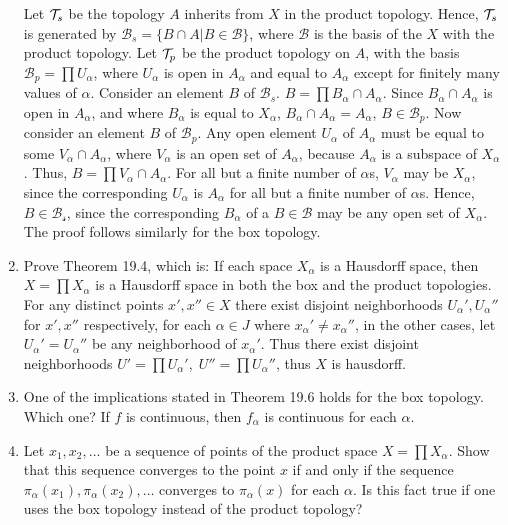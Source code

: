 \documentclass[12pt,letterpaper]{article}
\begin{document}
\begin{enumerate}
  \indent Let $\mathcal{T}_s$ be the topology $A$ inherits from $X$ in the product topology. Hence, $\mathcal{T}_s$ is generated by $\mathcal{B}_s = \{ B \cap A | B\in \mathcal{B} \}$, where $\mathcal{B}$ is the basis of the $X$ with the product topology. Let $\mathcal{T}_p$ be the product topology on $A$, with the basis $\mathcal{B}_p=\prod U_\alpha$, where $U_\alpha$ is open in $A_\alpha$ and equal to $A_\alpha$ except for finitely many values of $\alpha$. \n
  \indent Consider an element $B$ of $\mathcal{B}_s$. $B=\prod B_\alpha \cap A_\alpha$. Since $B_\alpha \cap A_\alpha$ is open in $A_\alpha$, and where $B_\alpha$ is equal to $X_\alpha$, $B_\alpha \cap A_\alpha = A_\alpha$, $B\in \mathcal{B}_p$.\hspace{5in}\n
  \indent Now consider an element $B$ of $\mathcal{B}_p$. Any open element $U_\alpha$ of $A_\alpha$ must be equal to some $V_\alpha \cap A_\alpha$, where $V_\alpha$ is an open set of $A_\alpha$, because $A_\alpha$ is a subspace of $X_\alpha$. Thus, $B=\prod V_\alpha \cap A_\alpha$. For all but a finite number of $\alpha$s, $V_\alpha$ may be $X_\alpha$, since the corresponding $U_\alpha$ is $A_\alpha$ for all but a finite number of $\alpha$s. Hence, $B\in \mathcal{B_s}$, since the corresponding $B_\alpha$ of a $B\in \mathcal{B}$ may be any open set of $X_\alpha$. The proof follows similarly for the box topology.
  \item Prove Theorem 19.4, which is: If each space $X_\alpha$ is a Hausdorff space, then $X=\prod X_\alpha$ is a Hausdorff space in both the box and the product topologies. \hspace{5in} \n
  \indent For any distinct points $x', x'' \in X$ there exist disjoint neighborhoods $U_\alpha', U_\alpha''$ for $x', x''$ respectively, for each $\alpha \in J$ where $x_\alpha' \neq x_\alpha''$, in the other cases, let $U_\alpha'=U_\alpha''$ be any neighborhood of $x_\alpha'$. Thus there exist disjoint neighborhoods $U' = \prod U_\alpha',\; U''=\prod U_\alpha''$, thus $X$ is hausdorff.
  \addtocounter{enumi}{1}
  \item One of the implications stated in Theorem 19.6 holds for the box topology. Which one?\n
  \indent If $f$ is continuous, then $f_\alpha$ is continuous for each $\alpha$.
  \item Let $x_1, x_2, \dots$ be a sequence of points of the product space $X=\prod X_\alpha$. Show that this sequence converges to the point $x$ if and only if the sequence $\pi_\alpha(x_1), \pi_\alpha(x_2), \dots$ converges to $\pi_\alpha(x)$ for each $\alpha$. Is this fact true if one uses the box topology instead of the product topology? \hspace{5in} \n

\end{enumerate}
\end{document}
